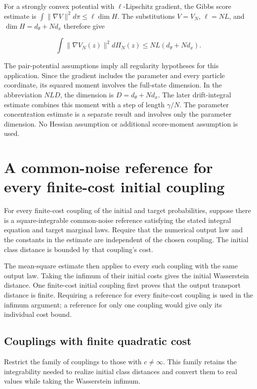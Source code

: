 \documentclass[11pt,a4paper]{article}
\begin{document}
For a strongly convex potential with \(\ell\)-Lipschitz gradient, the Gibbs score estimate is \(\int\|\nabla V\|^2d\pi\le\ell\dim H\). The substitutions \(V=V_N\), \(\ell=NL\), and \(\dim H=d_\theta+Nd_x\) therefore give

\[\int\|\nabla V_N(z)\|^2d\Pi_N(z)\le NL(d_\theta+Nd_x).\]

The pair-potential assumptions imply all regularity hypotheses for this application. Since the gradient includes the parameter and every particle coordinate, its squared moment involves the full-state dimension. In the abbreviation \(NL D\), the dimension is \(D=d_\theta+Nd_x\). The later drift-integral estimate combines this moment with a step of length \(\gamma/N\). The parameter concentration estimate is a separate result and involves only the parameter dimension. No Hessian assumption or additional score-moment assumption is used.




\section{\texorpdfstring{A common-noise reference for every finite-cost initial coupling}{A common-noise reference for every finite-cost initial coupling}}


For every finite-cost coupling of the initial and target probabilities, suppose there is a square-integrable common-noise reference satisfying the stated integral equation and target marginal laws. Require that the numerical output law and the constants in the estimate are independent of the chosen coupling. The initial class distance is bounded by that coupling's cost.



The mean-square estimate then applies to every such coupling with the same output law. Taking the infimum of their initial costs gives the initial Wasserstein distance. One finite-cost initial coupling first proves that the output transport distance is finite. Requiring a reference for every finite-cost coupling is used in the infimum argument; a reference for only one coupling would give only its individual cost bound.


\subsection{\texorpdfstring{Couplings with finite quadratic cost}{Couplings with finite quadratic cost}}


Restrict the family of couplings to those with \(c\ne\infty\). This family retains the integrability needed to realize initial class distances and convert them to real values while taking the Wasserstein infimum.
\end{document}

